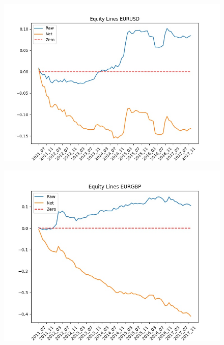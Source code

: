 \documentclass[a4paper]{article}
\begin{document}
\begin{figure}[h]
	\centering
	\begin{minipage}{.5\textwidth}
		\centering
		\includegraphics[width=\linewidth]{Figures/EURUSD.jpeg}
		\label{fig:11}
	\end{minipage}%
	\begin{minipage}{.5\textwidth}
		\centering
		\includegraphics[width=\linewidth]{Figures/EURGBP.jpeg}
		\label{fig:12}
	\end{minipage}
	\begin{minipage}{.5\textwidth}
		\centering

\end{minipage}
\end{figure}
\end{document}
